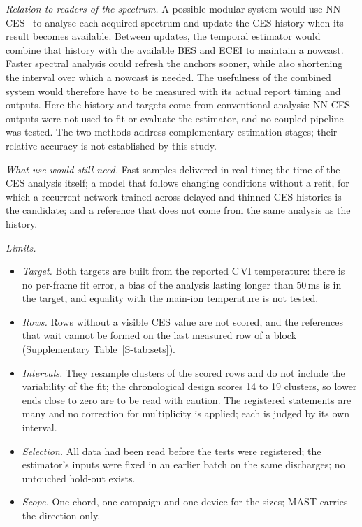 \documentclass[11pt,a4paper]{article}
\newcommand{\SuppTab}[1]{Supplementary Table~\ref{S-#1}}
\begin{document}
\emph{Relation to readers of the spectrum.} A possible modular system would use NN-CES~\citep{Lee2026NeuralNetworkbased} to analyse each acquired spectrum and update the CES history when its result becomes available. Between updates, the temporal estimator would combine that history with the available BES and ECEI to maintain a nowcast. Faster spectral analysis could refresh the anchors sooner, while also shortening the interval over which a nowcast is needed. The usefulness of the combined system would therefore have to be measured with its actual report timing and outputs. Here the history and targets come from conventional analysis: NN-CES outputs were not used to fit or evaluate the estimator, and no coupled pipeline was tested. The two methods address complementary estimation stages; their relative accuracy is not established by this study.

\emph{What use would still need.} Fast samples delivered in real time; the time of the
CES analysis itself; a model that follows changing conditions without a refit, for which
a recurrent network trained across delayed and thinned CES histories is the candidate;
and a reference that does not come from the same analysis as the history.

\emph{Limits.}
\begin{itemize}\setlength{\itemsep}{1pt}\setlength{\parskip}{0pt}
\item \emph{Target.} Both targets are built from the reported C\,VI temperature: there is
no per-frame fit error, a bias of the analysis lasting longer than 50\,ms is in the
target, and equality with the main-ion temperature is not tested.
\item \emph{Rows.} Rows without a visible CES value are not scored, and the references
that wait cannot be formed on the last measured row of a block (\SuppTab{tab:sets}).
\item \emph{Intervals.} They resample clusters of the scored rows and do not include the
variability of the fit; the chronological design scores 14 to 19 clusters, so lower ends
close to zero are to be read with caution. The registered statements are many and no
correction for multiplicity is applied; each is judged by its own interval.
\item \emph{Selection.} All data had been read before the tests were registered; the
estimator's inputs were fixed in an earlier batch on the same discharges; no untouched
hold-out exists.
\item \emph{Scope.} One chord, one campaign and one device for the sizes; MAST carries
the direction only.
\end{itemize}
\end{document}
